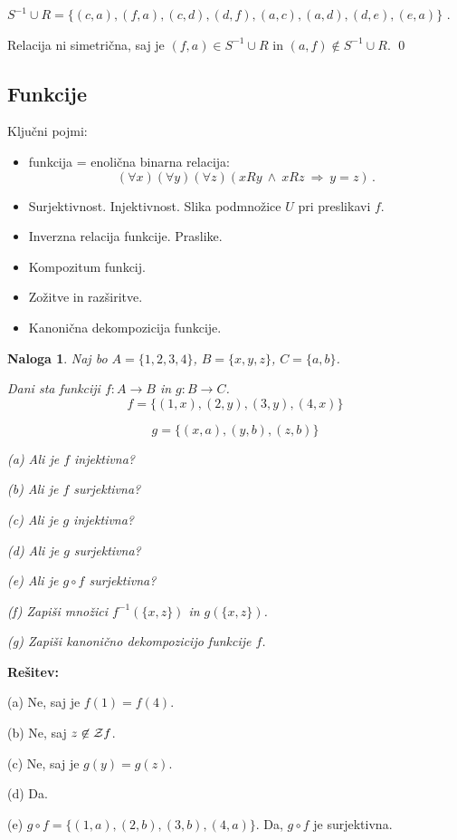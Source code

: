 \documentclass[11pt,paper=b5,footinclude,headinclude]{scrbook} %
\def\inn {{~\wedge~}}
\def\sledi {{~\Rightarrow~}}
\newtheorem*{problem}{Naloga}
\begin{document}
$S^{-1}\cup R = \{(c, a), (f, a), (c, d), (d, f),
(a, c), (a, d), (d, e), (e, a)\}$ .

Relacija ni simetrična, saj je $(f,a)\in S^{-1}\cup R$ in $(a,f)\not\in S^{-1}\cup R$.
\qed


\subsection{Funkcije}

Ključni pojmi:
\begin{itemize}
  \item funkcija = enolična binarna relacija:
  $$(\forall x)(\forall y)(\forall z)(xRy\inn xRz\sledi y = z)\,.$$
  \item Surjektivnost. Injektivnost. Slika podmnožice $U$ pri preslikavi $f$.
  \item Inverzna relacija funkcije. Praslike.
  \item Kompozitum funkcij.
  \item Zožitve in razširitve.
  \item Kanonična dekompozicija funkcije.
\end{itemize}

\begin{problem}
Naj bo $A = \{1,2,3,4\}$, $B = \{x,y,z\}$, $C = \{a,b\}$.

Dani sta funkciji $f:A\to B$ in $g:B\to C$.
$$f = \{(1,x),(2,y),(3,y),(4,x)\}$$

$$g = \{(x,a),(y,b),(z,b)\}$$

(a) Ali je $f$ injektivna?

(b) Ali je $f$ surjektivna?

(c) Ali je $g$ injektivna?

(d) Ali je $g$ surjektivna?

(e) Ali je $g\circ f$ surjektivna?

(f) Zapiši množici $f^{-1}(\{x,z\})$ in $g(\{x,z\})$.

(g) Zapiši kanonično dekompozicijo funkcije $f$.
\end{problem}

\textbf{Rešitev:}

(a) Ne, saj je $f(1) = f(4)$.

(b) Ne, saj $z\not\in{\cal Z} f$.

(c) Ne, saj je $g(y) = g(z)$.

(d) Da.

(e) $g\circ f = \{(1,a), (2,b), (3,b), (4,a)\}$. Da, $g\circ f$ je surjektivna.
\end{document}
